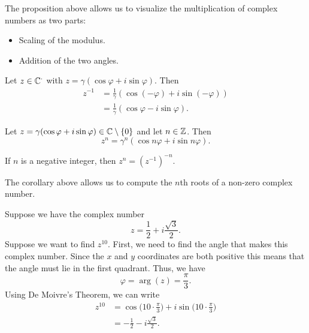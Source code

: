 \documentclass[a4paper]{report}
\begin{document}
The proposition above allows us to visualize the multiplication of complex numbers as two parts:
    \begin{itemize}
        \item Scaling of the modulus.
        \item Addition of the two angles.
    \end{itemize}

\begin{corollary}
    Let \( z \in \mathbb{C}^{\cdot} \) with \( z = \gamma (\cos \varphi + i \sin \varphi) \). Then \begin{align*}
        z^{-1} &= \frac{ 1  }{  \gamma  }  ( \cos (- \varphi) + i \sin (- \varphi)) \\
               &= \frac{ 1 }{  \gamma  }  (\cos \varphi - i \sin \varphi).
    \end{align*}
\end{corollary}


\begin{corollary}
   Let \( z = \gamma (\cos \varphi + i \sin \varphi) \in \mathbb{C} \setminus  \{ 0 \}  \) and let \( n \in \mathbb{Z}   \). Then
   \[  z^{n} = \gamma^{n} (\cos n \varphi + i \sin n \varphi). \]
\end{corollary}

\begin{remark}
 If \( n  \) is a negative integer, then \( z^{n} = (z^{-1})^{-n} \). 
\end{remark}

The corollary above allows us to compute the \( n \)th roots of a non-zero complex number.

\begin{eg}
   Suppose we have the complex number  
   \[  z = \frac{ 1 }{ 2 }  + i \frac{ \sqrt{ 3 }  }{ 2 }. \]
  Suppose we want to find \( z^{10} \). First, we need to find the angle that makes this complex number. Since the \( x  \) and \( y  \) coordinates are both positive this means that the angle must lie in the first quadrant. Thus, we have 
  \[  \varphi = \arg(z) = \frac{ \pi }{ 3  }. \]
  Using De Moivre's Theorem, we can write
  \begin{align*}
      z^{10 } &= \cos \Big(  10 \cdot \frac{ \pi  }{ 3 }  \Big) + i \sin \Big(  10 \cdot \frac{ \pi }{ 3 }  \Big) \\
              &= -\frac{1 }{ 2 }  - i \frac{ \sqrt{ 3 }  }{ 2 }. 
  \end{align*}
\end{eg}
\end{document}
